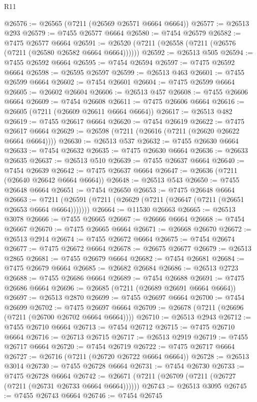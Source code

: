 \begin{lexlean}{R11}
\begin{coremodule}
@26576 := @26565 (@7211 (@26569 @26571 @6664 @6664))
@26577 := @26513 @293
@26579 := @7455 @26577 @6664
@26580 := @7454 @26579
@26582 := @7475 @26577 @6664
@26591 := @26520 (@7211 (@26558 (@7211 (@26576 (@7211 (@26580 @26582 @6664 @6664))))))
@26592 := @26513 @505
@26594 := @7455 @26592 @6664
@26595 := @7454 @26594
@26597 := @7475 @26592 @6664
@26598 := @26595 @26597
@26599 := @26513 @463
@26601 := @7455 @26599 @6664
@26602 := @7454 @26601
@26604 := @7475 @26599 @6664
@26605 := @26602 @26604
@26606 := @26513 @457
@26608 := @7455 @26606 @6664
@26609 := @7454 @26608
@26611 := @7475 @26606 @6664
@26616 := @26605 (@7211 (@26609 @26611 @6664 @6664))
@26617 := @26513 @482
@26619 := @7455 @26617 @6664
@26620 := @7454 @26619
@26622 := @7475 @26617 @6664
@26629 := @26598 (@7211 (@26616 (@7211 (@26620 @26622 @6664 @6664))))
@26630 := @26513 @537
@26632 := @7455 @26630 @6664
@26633 := @7454 @26632
@26635 := @7475 @26630 @6664
@26636 := @26633 @26635
@26637 := @26513 @510
@26639 := @7455 @26637 @6664
@26640 := @7454 @26639
@26642 := @7475 @26637 @6664
@26647 := @26636 (@7211 (@26640 @26642 @6664 @6664))
@26648 := @26513 @543
@26650 := @7455 @26648 @6664
@26651 := @7454 @26650
@26653 := @7475 @26648 @6664
@26663 := @7211 (@26591 (@7211 (@26629 (@7211 (@26647 (@7211 (@26651 @26653 @6664 @6664)))))))
@26664 := @11530 @26663
@26665 := @26513 @3078
@26666 := @7455 @26665
@26667 := @26666 @6664
@26668 := @7454 @26667
@26670 := @7475 @26665 @6664
@26671 := @26668 @26670
@26672 := @26513 @2914
@26674 := @7455 @26672 @6664
@26675 := @7454 @26674
@26677 := @7475 @26672 @6664
@26678 := @26675 @26677
@26679 := @26513 @2865
@26681 := @7455 @26679 @6664
@26682 := @7454 @26681
@26684 := @7475 @26679 @6664
@26685 := @26682 @26684
@26686 := @26513 @2723
@26688 := @7455 @26686 @6664
@26689 := @7454 @26688
@26691 := @7475 @26686 @6664
@26696 := @26685 (@7211 (@26689 @26691 @6664 @6664))
@26697 := @26513 @2870
@26699 := @7455 @26697 @6664
@26700 := @7454 @26699
@26702 := @7475 @26697 @6664
@26709 := @26678 (@7211 (@26696 (@7211 (@26700 @26702 @6664 @6664))))
@26710 := @26513 @2943
@26712 := @7455 @26710 @6664
@26713 := @7454 @26712
@26715 := @7475 @26710 @6664
@26716 := @26713 @26715
@26717 := @26513 @2919
@26719 := @7455 @26717 @6664
@26720 := @7454 @26719
@26722 := @7475 @26717 @6664
@26727 := @26716 (@7211 (@26720 @26722 @6664 @6664))
@26728 := @26513 @3014
@26730 := @7455 @26728 @6664
@26731 := @7454 @26730
@26733 := @7475 @26728 @6664
@26742 := @26671 (@7211 (@26709 (@7211 (@26727 (@7211 (@26731 @26733 @6664 @6664))))))
@26743 := @26513 @3095
@26745 := @7455 @26743 @6664
@26746 := @7454 @26745

\end{coremodule}
\end{lexlean}
